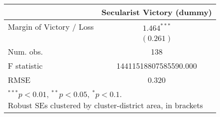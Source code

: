
\begin{tabular}{l c }
\hline
 & Secularist Victory (dummy) \\
\hline
Margin of Victory / Loss & $1.464^{***}$         \\
                         & $(0.261)$             \\
\hline
Num. obs.                & 138                   \\
F statistic              & 14411518807585590.000 \\
RMSE                     & 0.320                 \\
\hline
\multicolumn{2}{l}{\scriptsize{\parbox{.4\linewidth}{\vspace{2pt}$^{***}p<0.01$, $^{**}p<0.05$, $^*p<0.1$. \\
       Robust SEs clustered by cluster-district area, in brackets\\}}}
\end{tabular}
